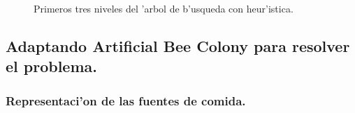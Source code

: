 \documentclass[12pt]{article}
\begin{document}
    \begin{figure}[H]
        \centering
        \caption{Primeros tres niveles del 'arbol de b'usqueda con heur'istica.}
        \label{fig:tree2}
    \end{figure}


    \subsection{Adaptando Artificial Bee Colony para resolver el problema.}

    \subsubsection{Representaci'on de las fuentes de comida.}
\end{document}
